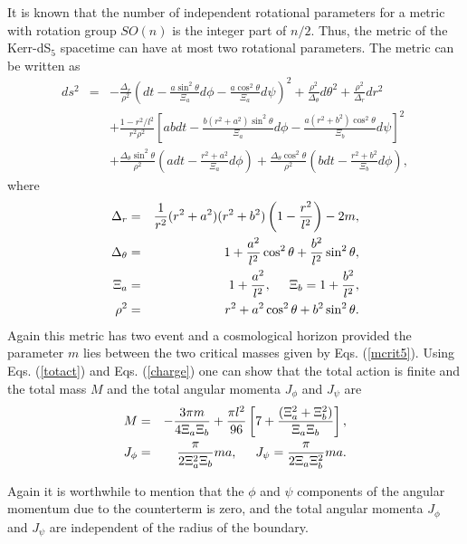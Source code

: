 \documentclass[a4paper,12pt,onecolumn]{revtex4}
\begin{document}
It is known that the number of independent rotational parameters
for a metric with rotation group $SO(n)$ is the integer part of
$n/2$. Thus, the metric of the Kerr-dS$_5$ spacetime can have at
most two rotational parameters. The metric can be written as
\begin{eqnarray}
ds^2 &=&-\frac{\Delta _r}{\rho ^2}\left(dt-\frac{a\sin ^2\theta }{\Xi _a}d\phi -%
\frac{a\cos ^2\theta }{\Xi _a}d\psi \right)^2+\frac{\rho ^2}{\Delta _\theta }%
d\theta ^2+\frac{\rho ^2}{\Delta _r}dr^2  \nonumber \\
&&+\frac{1-r^2/l^2}{r^2\rho ^2}\left[abdt-\frac{b(r^2+a^2)\sin ^2\theta }{\Xi _a}%
d\phi -\frac{a(r^2+b^2)\cos ^2\theta }{\Xi _b}d\psi \right]^2  \nonumber \\
&&+\frac{\Delta _\theta \sin ^2\theta }{\rho ^2}\left(adt-\frac{r^2+a^2}{\Xi _a}%
d\phi \right)+\frac{\Delta _\theta \cos ^2\theta }{\rho
^2}\left(bdt-\frac{r^2+b^2}{\Xi _b}d\phi \right),  \label{metr2a}
\end{eqnarray}
where
\begin{eqnarray}
\Delta _r &=&\frac
1{r^2}(r^2+a^2)(r^2+b^2)\left(1-\frac{r^2}{l^2}\right)-2m,
\nonumber
\\
\Delta _\theta  &=&1+\frac{a^2}{l^2}\cos ^2\theta +\frac{b^2}{l^2}\sin
^2\theta ,  \nonumber \\
\Xi _a &=&1+\frac{a^2}{l^2},\hspace{.5cm}\Xi _b=1+\frac{b^2}{l^2},  \nonumber
\\
\rho ^2 &=&r^2+a^2\cos ^2\theta +b^2\sin ^2\theta .  \label{metr2b}
\end{eqnarray}
Again this metric has two event and a cosmological horizon
provided the parameter $m$ lies between the two critical masses
given by Eqs. (\ref {mcrit5}). Using Eqs. (\ref{totact}) and Eqs.
(\ref{charge}) one can show that the total action is finite and
the total mass $M$ and the total angular momenta $J_\phi $ and
$J_\psi $ are
\begin{eqnarray*}
M &=&-\frac{3\pi m}{4\Xi _a\Xi _b}+\frac{\pi
l^2}{96}\left[7+\frac{(\Xi^2 _a+\Xi^2
_b)}{\Xi _a\Xi _b}\right], \\
J_\phi  &=&\frac \pi {2\Xi _a^2\Xi _b}ma,\hspace{.5cm }J_\psi =\frac \pi
{2\Xi _a\Xi _b^2}ma.
\end{eqnarray*}

Again it is worthwhile to mention that the $\phi $ and $\psi $
components of the angular momentum due to the counterterm is zero,
and the total angular momenta $J_\phi $ and $J_\psi $ are
independent of the radius of the boundary.
\end{document}
